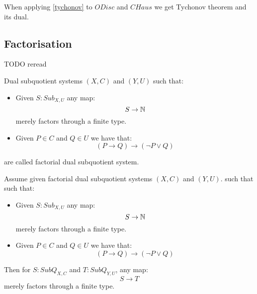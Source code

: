 When applying \cref{tychonov} to $ODisc$ and $CHaus$ we get Tychonov theorem and its dual.


\subsection{Factorisation}

TODO reread

\begin{definition}
Dual subquotient systems $(X,C)$ and $(Y,U)$ such that:
\begin{itemize}
\item Given $S:Sub_{X,U}$ any map:
\[S\to \mathbb{N}\]
merely factors through a finite type.
\item Given $P\in C$ and $Q\in U$ we have that:
\[(P\to Q) \to (\neg P \lor Q)\]
\end{itemize}
are called factorial dual subquotient system.
\end{definition}

\begin{proposition}\label{factorisation-subquotient}
Assume given factorial dual subquotient systems $(X,C)$ and $(Y,U)$. such that
such that:
\begin{itemize}
\item Given $S:Sub_{X,U}$ any map:
\[S\to \mathbb{N}\]
merely factors through a finite type.
\item Given $P\in C$ and $Q\in U$ we have that:
\[(P\to Q) \to (\neg P \lor Q)\]
\end{itemize}
Then for $S:SubQ_{X,C}$ and $T:SubQ_{Y,U}$, any map:
\[S\to T\]
merely factors through a finite type.
\end{proposition}

